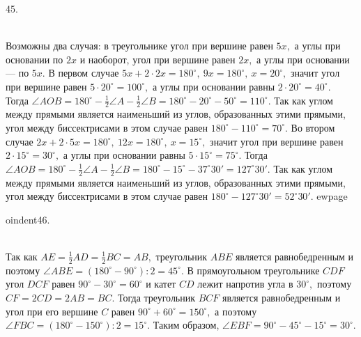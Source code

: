 45. \begin{figure}[ht!]
\end{figure}\\
Возможны два случая: в треугольнике угол при вершине равен $5x,$ а углы при основании по $2x$ и наоборот, угол при вершине равен $2x,$ а углы при основании --- по $5x.$ В первом случае $5x+2\cdot2x=180^\circ,\ 9x=180^\circ,\ x=20^\circ,$ значит угол при вершине равен $5\cdot20^\circ=100^\circ,$ а углы при основании равны $2\cdot20^\circ=40^\circ.$ Тогда $\angle AOB=180^\circ-\frac{1}{2}\angle A-\frac{1}{2}\angle B=180^\circ-20^\circ-50^\circ=110^\circ.$ Так как углом между прямыми является наименьший из углов, образованных этими прямыми, угол между биссектрисами в этом случае равен $180^\circ-110^\circ=70^\circ.$ Во втором случае $2x+2\cdot5x=180^\circ,\ 12x=180^\circ,\ x=15^\circ,$ значит угол при вершине равен $2\cdot15^\circ=30^\circ,$ а углы при основании равны $5\cdot15^\circ=75^\circ.$
Тогда $\angle AOB=180^\circ-\frac{1}{2}\angle A-\frac{1}{2}\angle B=180^\circ-15^\circ-37^\circ30'=127^\circ30'.$ Так как углом между прямыми является наименьший из углов, образованных этими прямыми, угол между биссектрисами в этом случае равен $180^\circ-127^\circ30'=52^\circ30'.$
ewpage

oindent46. \begin{figure}[ht!]
\end{figure}\\
Так как $AE=\frac{1}{2}AD=\frac{1}{2}BC=AB,$ треугольник $ABE$ является равнобедренным и поэтому $\angle ABE=(180^\circ-90^\circ):2=45^\circ.$ В прямоугольном треугольнике $CDF$ угол $DCF$ равен $90^\circ-30^\circ=60^\circ$ и катет $CD$ лежит напротив угла в $30^\circ,$ поэтому $CF=2CD=2AB=BC.$ Тогда треугольник $BCF$ является равнобедренным и угол при его вершине $C$ равен $90^\circ+60^\circ=150^\circ,$ а поэтому $\angle FBC=(180^\circ-150^\circ):2=15^\circ.$ Таким образом, $\angle EBF=90^\circ-45^\circ-15^\circ=30^\circ.$\\
